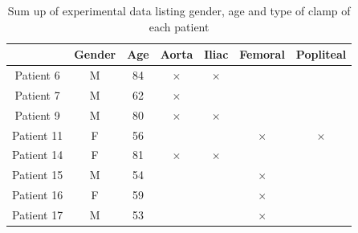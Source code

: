 \documentclass{config}
\begin{document}
\begin{table}[H]
\begin{center}
\begin{tabular}{|c|c|c|c|c|c|c|}
\hline
& Gender & Age & Aorta & Iliac & Femoral & Popliteal \\ 
\hline 
Patient 6 & M & 84 & $\times$ & $\times$  & & \\ 
\hline 
Patient 7 & M & 62 & $\times$ & & & \\
\hline 
Patient 9 & M & 80 &$\times$ & $\times$ & &  \\
\hline 
Patient 11 & F & 56 & & &$\times$ & $\times$\\
\hline 
Patient 14 & F & 81 &$\times$ & $\times$& & \\
\hline 
Patient 15 & M & 54 & & & $\times$ & \\
\hline 
Patient 16 & F & 59 & & &$\times$ & \\
\hline 
Patient 17 & M & 53 & & &$\times$ & \\
\hline 
\end{tabular}
\caption{Sum up of experimental data listing gender, age and type of clamp of each patient}
\label{patient_tab}
\end{center}
\end{table}
\end{document}
